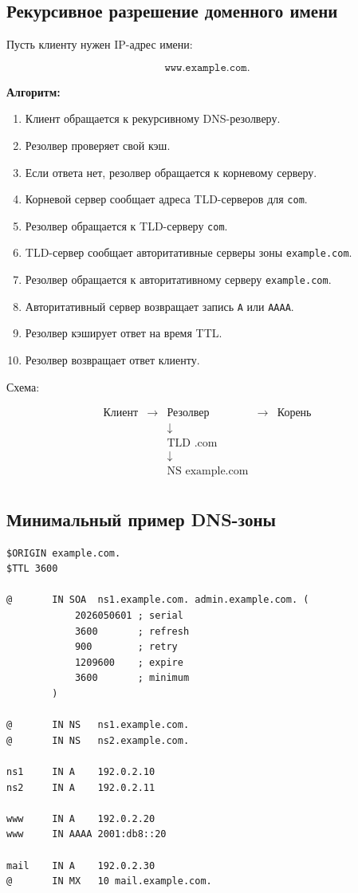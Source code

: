 \documentclass[12pt,a4paper]{article}
\begin{document}
\subsection{Рекурсивное разрешение доменного имени}

Пусть клиенту нужен IP-адрес имени:

\[
\texttt{www.example.com}.
\]

\textbf{Алгоритм:}

\begin{enumerate}
    \item Клиент обращается к рекурсивному DNS-резолверу.
    \item Резолвер проверяет свой кэш.
    \item Если ответа нет, резолвер обращается к корневому серверу.
    \item Корневой сервер сообщает адреса TLD-серверов для \texttt{com}.
    \item Резолвер обращается к TLD-серверу \texttt{com}.
    \item TLD-сервер сообщает авторитативные серверы зоны \texttt{example.com}.
    \item Резолвер обращается к авторитативному серверу \texttt{example.com}.
    \item Авторитативный сервер возвращает запись \texttt{A} или \texttt{AAAA}.
    \item Резолвер кэширует ответ на время TTL.
    \item Резолвер возвращает ответ клиенту.
\end{enumerate}

Схема:

\[
\begin{array}{ccccc}
\text{Клиент}
& \rightarrow &
\text{Резолвер}
& \rightarrow &
\text{Корень} \\
& & \downarrow & & \\
& & \text{TLD .com} & & \\
& & \downarrow & & \\
& & \text{NS example.com} & & \\
\end{array}
\]

\subsection{Минимальный пример DNS-зоны}

\begin{lstlisting}
$ORIGIN example.com.
$TTL 3600

@       IN SOA  ns1.example.com. admin.example.com. (
            2026050601 ; serial
            3600       ; refresh
            900        ; retry
            1209600    ; expire
            3600       ; minimum
        )

@       IN NS   ns1.example.com.
@       IN NS   ns2.example.com.

ns1     IN A    192.0.2.10
ns2     IN A    192.0.2.11

www     IN A    192.0.2.20
www     IN AAAA 2001:db8::20

mail    IN A    192.0.2.30
@       IN MX   10 mail.example.com.
\end{lstlisting}
\end{document}
